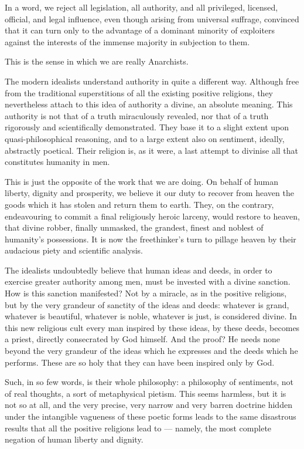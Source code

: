 \documentclass[12pt]{report}
\begin{document}
In a word, we reject all legislation, all authority, and all privileged, licensed, official, and legal influence, even though arising from universal suffrage, convinced that it can turn only to the advantage of a dominant minority of exploiters against the interests of the immense majority in subjection to them.


This is the sense in which we are really Anarchists.


The modern idealists understand authority in quite a different way. Although free from the traditional superstitions of all the existing positive religions, they nevertheless attach to this idea of authority a divine, an absolute meaning. This authority is not that of a truth miraculously revealed, nor that of a truth rigorously and scientifically demonstrated. They base it to a slight extent upon quasi-philosophical reasoning, and to a large extent also on sentiment, ideally, abstractly poetical. Their religion is, as it were, a last attempt to divinise all that constitutes humanity in men.


This is just the opposite of the work that we are doing. On behalf of human liberty, dignity and prosperity, we believe it our duty to recover from heaven the goods which it has stolen and return them to earth. They, on the contrary, endeavouring to commit a final religiously heroic larceny, would restore to heaven, that divine robber, finally unmasked, the grandest, finest and noblest of humanity’s possessions. It is now the freethinker’s turn to pillage heaven by their audacious piety and scientific analysis.


The idealists undoubtedly believe that human ideas and deeds, in order to exercise greater authority among men, must be invested with a divine sanction. How is this sanction manifested? Not by a miracle, as in the positive religions, but by the very grandeur of sanctity of the ideas and deeds: whatever is grand, whatever is beautiful, whatever is noble, whatever is just, is considered divine. In this new religious cult every man inspired by these ideas, by these deeds, becomes a priest, directly consecrated by God himself. And the proof? He needs none beyond the very grandeur of the ideas which he expresses and the deeds which he performs. These are so holy that they can have been inspired only by God.


Such, in so few words, is their whole philosophy: a philosophy of sentiments, not of real thoughts, a sort of metaphysical pietism. This seems harmless, but it is not so at all, and the very precise, very narrow and very barren doctrine hidden under the intangible vagueness of these poetic forms leads to the same disastrous results that all the positive religions lead to — namely, the most complete negation of human liberty and dignity.
\end{document}
